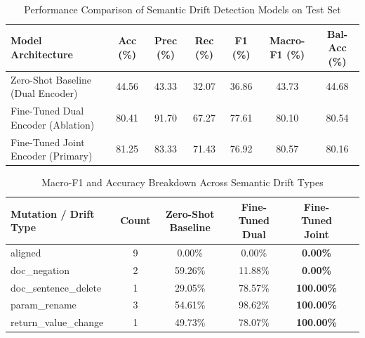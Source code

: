 \begin{table}[htbp]
\caption{Performance Comparison of Semantic Drift Detection Models on Test Set}
\label{tab:model_comparison}
\centering
\begin{tabular}{lcccccc}
\hline
\textbf{Model Architecture} & \textbf{Acc (\%)} & \textbf{Prec (\%)} & \textbf{Rec (\%)} & \textbf{F1 (\%)} & \textbf{Macro-F1 (\%)} & \textbf{Bal-Acc (\%)} \\
\hline
Zero-Shot Baseline (Dual Encoder) & 44.56 & 43.33 & 32.07 & 36.86 & 43.73 & 44.68 \\
Fine-Tuned Dual Encoder (Ablation) & 80.41 & 91.70 & 67.27 & 77.61 & 80.10 & 80.54 \\
Fine-Tuned Joint Encoder (Primary) & 81.25 & 83.33 & 71.43 & 76.92 & 80.57 & 80.16 \\
\hline
\end{tabular}
\end{table}

\begin{table}[htbp]
\caption{Macro-F1 and Accuracy Breakdown Across Semantic Drift Types}
\label{tab:drift_type_breakdown}
\centering
\begin{tabular}{lccccc}
\hline
\textbf{Mutation / Drift Type} & \textbf{Count} & \textbf{Zero-Shot Baseline} & \textbf{Fine-Tuned Dual} & \textbf{Fine-Tuned Joint} \\
\hline
aligned                   & 9     & 0.00\% & 0.00\% & \textbf{0.00\%} \\
doc_negation              & 2     & 59.26\% & 11.88\% & \textbf{0.00\%} \\
doc_sentence_delete       & 1     & 29.05\% & 78.57\% & \textbf{100.00\%} \\
param_rename              & 3     & 54.61\% & 98.62\% & \textbf{100.00\%} \\
return_value_change       & 1     & 49.73\% & 78.07\% & \textbf{100.00\%} \\
\hline
\end{tabular}
\end{table}
